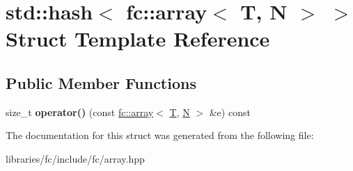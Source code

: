 \hypertarget{structstd_1_1hash_3_01fc_1_1array_3_01_t_00_01_n_01_4_01_4}{}\section{std\+:\+:hash$<$ fc\+:\+:array$<$ T, N $>$ $>$ Struct Template Reference}
\label{structstd_1_1hash_3_01fc_1_1array_3_01_t_00_01_n_01_4_01_4}
\subsection*{Public Member Functions}
\begin{DoxyCompactItemize}
\item 
\mbox{\label{structstd_1_1hash_3_01fc_1_1array_3_01_t_00_01_n_01_4_01_4_af8cf2f21a390f471be481bfd3221fd8c}} 
size\+\_\+t {\bfseries operator()} (const \mbox{\hyperlink{classfc_1_1array}{fc\+::array}}$<$ \mbox{\hyperlink{struct_t}{T}}, \mbox{\hyperlink{group__types_gaf9c1edb0e0da55ec6ba09f32f6839529}{N}} $>$ \&e) const
\end{DoxyCompactItemize}


The documentation for this struct was generated from the following file\+:\begin{DoxyCompactItemize}
\item 
libraries/fc/include/fc/array.\+hpp\end{DoxyCompactItemize}
